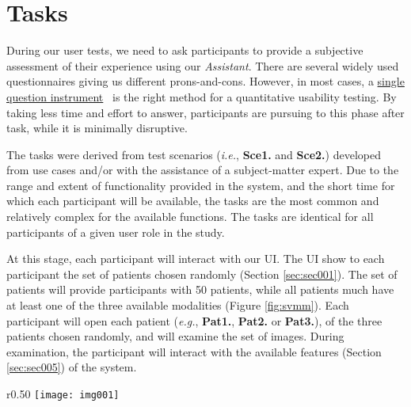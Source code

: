 
\section{Tasks}
\label{sec:sec007}

During our user tests, we need to ask participants to provide a subjective assessment of their experience using our \textit{Assistant}. There are several widely used questionnaires giving us different prons-and-cons. However, in most cases, a \hyperlink{https://www.nngroup.com/articles/keep-online-surveys-short/}{single question instrument}~\cite{sauro201210} is the right method for a quantitative usability testing. By taking less time and effort to answer, participants are pursuing to this phase after task, while it is minimally disruptive.

\clearpage

The tasks were derived from test scenarios ({\it i.e.}, {\bf Sce1.} and {\bf Sce2.}) developed from use cases and/or with the assistance of a subject-matter expert.  Due to the range and extent of functionality provided in the system, and the short time for which each participant will be available, the tasks are the most common and relatively complex for the available functions. The tasks are identical for all participants of a given user role in the study.

At this stage, each participant will interact with our UI. The UI show to each participant the set of patients chosen randomly (Section \ref{sec:sec001}). The set of patients will provide participants with 50 patients, while all patients much have at least one of the three available modalities (Figure \ref{fig:svmm}). Each participant will open each patient ({\it e.g.}, {\bf Pat1.}, {\bf Pat2.} or {\bf Pat3.}), of the three patients chosen randomly, and will examine the set of images. During examination, the participant will interact with the available features (Section \ref{sec:sec005}) of the system.


\hfill

\begin{wrapfigure}{r}{0.50\textwidth}
\centering
\texttt{[image: img001]}
\caption{Diagram representing the use of the \textit{Assistant} by clinicians. Each patient can have, and is not limited to have more images per modality.}
\label{fig:svmm}
\end{wrapfigure}

